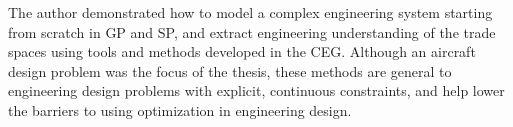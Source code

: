 The author demonstrated how to model a complex engineering system
starting from scratch in \gls{GP} and \gls{SP}, and extract engineering understanding of
the trade spaces using tools and methods developed in the \gls{CEG}.
Although an aircraft design problem was the focus of the thesis,
these methods are general to engineering design problems with explicit, continuous constraints,
and help lower the barriers to using optimization in engineering design.

